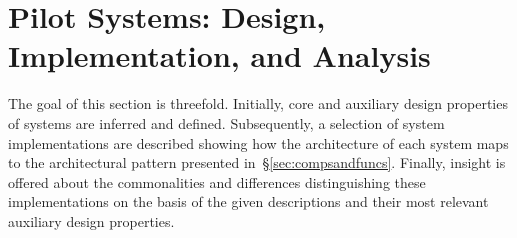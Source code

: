 \documentclass{sig-alternate}
\begin{document}
\section{Pilot Systems: Design, Implementation, and Analysis}
\label{sec:analysis}



The goal of this section is threefold. Initially, core and auxiliary design
properties of \pilot systems are inferred and defined. Subsequently, a selection
of \pilot system implementations are described showing how the architecture of
each system maps to the architectural pattern presented
in~\S\ref{sec:compsandfuncs}. Finally, insight is offered about the
commonalities and differences distinguishing these implementations on the basis
of the given descriptions and their most relevant auxiliary design properties.


 

%

\end{document}
